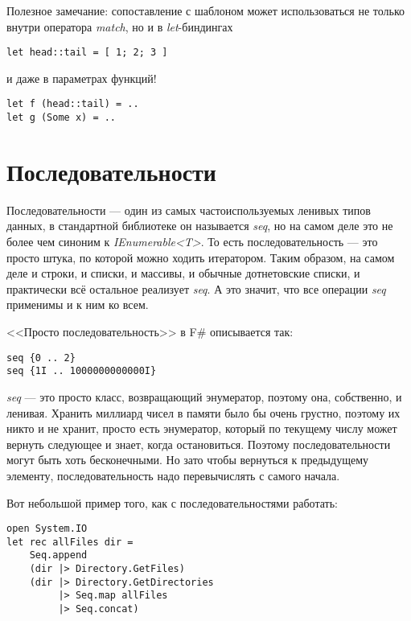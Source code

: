\documentclass{../../text-style}
\begin{document}
Полезное замечание: сопоставление с шаблоном может использоваться не только внутри оператора \textit{match}, но и в \textit{let}-биндингах

\begin{verbatim}
let head::tail = [ 1; 2; 3 ]
\end{verbatim}

и даже в параметрах функций!  

\begin{verbatim}
let f (head::tail) = ..
let g (Some x) = ..
\end{verbatim}

\section{Последовательности}

Последовательности --- один из самых частоиспользуемых ленивых типов данных, в стандартной библиотеке он называется \textit{seq}, но на самом деле это не более чем синоним к \textit{IEnumerable<T>}. То есть последовательность --- это просто штука, по которой можно ходить итератором. Таким образом, на самом деле и строки, и списки, и массивы, и обычные дотнетовские списки, и практически всё остальное реализует \textit{seq}. А это значит, что все операции \textit{seq} применимы и к ним ко всем.

<<Просто последовательность>> в F\# описывается так:

\begin{verbatim}
seq {0 .. 2}
seq {1I .. 1000000000000I}
\end{verbatim}

\textit{seq} --- это просто класс, возвращающий энумератор, поэтому она, собственно, и ленивая. Хранить миллиард чисел в памяти было бы очень грустно, поэтому их никто и не хранит, просто есть энумератор, который по текущему числу может вернуть следующее и знает, когда остановиться. Поэтому последовательности могут быть хоть бесконечными. Но зато чтобы вернуться к предыдущему элементу, последовательность надо перевычислять с самого начала.

Вот небольшой пример того, как с последовательностями работать:

\begin{verbatim}
open System.IO
let rec allFiles dir =
    Seq.append
    (dir |> Directory.GetFiles)
    (dir |> Directory.GetDirectories 
         |> Seq.map allFiles 
         |> Seq.concat)
\end{verbatim}
\end{document}
